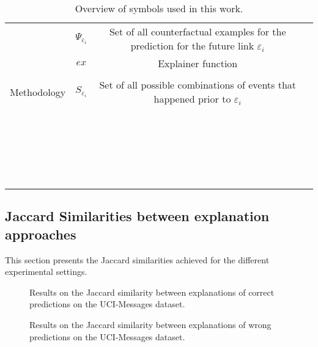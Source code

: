 \begin{table}
\begin{tabular}{lccl}
 & $\Psi_{\varepsilon_i}$& Set of all counterfactual examples for the prediction for the future link $\varepsilon_i$&\\
 & $ex$& Explainer function&\\
 & & &\\
 Methodology& $S_{\varepsilon_i}$& Set of all possible combinations of events that happened prior to $\varepsilon_i$&\\
 & & &\\
 & & &\\
 & & &\\
 & & &\\
 & & &\\
 & & &\\
 & & &\\
 & & &\\
 & & &\\
 & & &\\
 & & &\\
 & & &\\
 & & &\\
 & & &\\
 & & &\\
 & & &\\
 & & &\\
 & & &\\
 & & &\\
 & & &\\
 & & &\\
 & & &\\
    \end{tabular}
    \caption{Overview of symbols used in this work.}
    \label{t_Appendix_symbols}
\end{table}



\subsection{Jaccard Similarities between explanation approaches}
\label{s_Appendix_JaccardSimilarities}

This section presents the Jaccard similarities achieved for the different experimental settings.

\begin{figure}[ht]
    \centering
    
    \caption{Results on the Jaccard similarity between explanations of correct predictions on the UCI-Messages dataset.}
\end{figure}

\begin{figure}[ht]
    \centering
    
    \caption{Results on the Jaccard similarity between explanations of wrong predictions on the UCI-Messages dataset.}
\end{figure}

